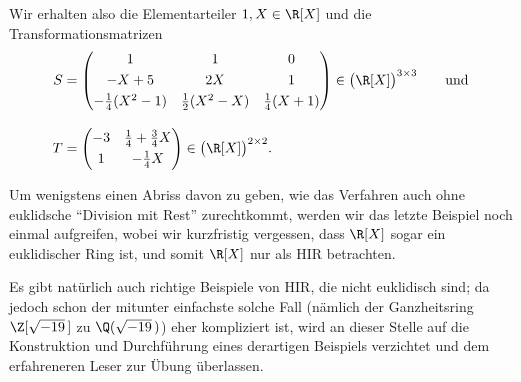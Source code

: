 \begin{thBeisp}
    \medskip
    Wir erhalten also die Elementarteiler $1,X\in\R[X]$ und die
    Transformationsmatrizen
    \begin{align*}
        S &= \Matrix{
        1 & 1 & 0       \\[3pt]
        -X+5 & 2X & 1   \\[3pt]
        -\frac{1}{4} (X^2-1) & \frac{1}{2} (X^2-X) & \frac{1}{4} (X+1)   }
        \in \bigl(\R[X]\bigr)^{3\times3}
        \qquad\text{und}
        \\[3mm]
        T &= \Matrix{
            -3 & \frac{1}{4}+\frac{3}{4}X   \\[3pt]
            1  & -\frac{1}{4}X                  }
        \in \bigl(\R[X]\bigr)^{2\times2}
    .
    \end{align*}
        
    
\end{thBeisp}

Um wenigstens einen Abriss davon zu geben, wie das Verfahren auch ohne
euklidsche \enquote{Division mit Rest} zurechtkommt, werden wir das letzte
Beispiel noch einmal aufgreifen, wobei wir kurzfristig vergessen, dass $\R[X]$
sogar ein euklidischer Ring ist, und somit $\R[X]$ nur als HIR betrachten.

\begin{thBemerkung}
    Es gibt natürlich auch richtige Beispiele von HIR, die nicht euklidisch
    sind; da jedoch schon der mitunter einfachste solche Fall (nämlich der
    Ganzheitsring $\Z[\sqrt{-19}\,]$ zu $\Q(\sqrt{-19}\,)$) eher kompliziert ist,
    wird an dieser Stelle auf die Konstruktion und Durchführung eines derartigen
    Beispiels verzichtet und dem erfahreneren Leser zur Übung überlassen.
\end{thBemerkung}

